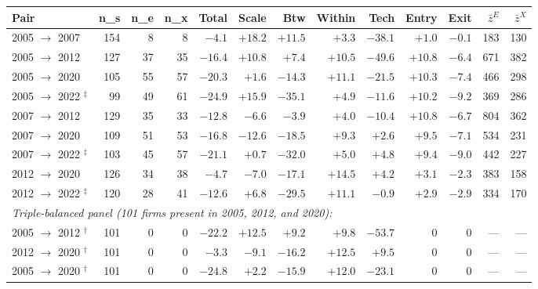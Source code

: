 \documentclass[11pt]{article}
\begin{document}
\begin{center}
\footnotesize
\begin{tabular}{lrrrrrrrrrrrr}
\toprule
Pair & n\_s & n\_e & n\_x & Total & Scale & Btw & Within & Tech & Entry & Exit & $\bar z^E$ & $\bar z^X$ \\
\midrule
2005 $\to$ 2007 & 154 & 8  & 8  & $-4.1$  & $+18.2$ & $+11.5$ & $+3.3$  & $-38.1$ & $+1.0$  & $-0.1$ & 183 & 130 \\
2005 $\to$ 2012 & 127 & 37 & 35 & $-16.4$ & $+10.8$ & $+7.4$  & $+10.5$ & $\mathbf{-49.6}$ & $+10.8$ & $-6.4$ & 671 & 382 \\
2005 $\to$ 2020 & 105 & 55 & 57 & $-20.3$ & $+1.6$  & $-14.3$ & $+11.1$ & $-21.5$          & $+10.3$ & $-7.4$ & 466 & 298 \\
2005 $\to$ 2022 $^{\ddagger}$ & 99  & 49 & 61 & $\mathbf{-24.9}$ & $+15.9$ & $-35.1$ & $+4.9$  & $\mathbf{-11.6}$ & $+10.2$ & $-9.2$ & 369 & 286 \\
2007 $\to$ 2012 & 129 & 35 & 33 & $-12.8$ & $-6.6$  & $-3.9$  & $+4.0$  & $-10.4$          & $+10.8$ & $-6.7$ & 804 & 362 \\
2007 $\to$ 2020 & 109 & 51 & 53 & $-16.8$ & $-12.6$ & $-18.5$ & $+9.3$  & $\mathbf{+2.6}$  & $+9.5$  & $-7.1$ & 534 & 231 \\
2007 $\to$ 2022 $^{\ddagger}$ & 103 & 45 & 57 & $\mathbf{-21.1}$ & $+0.7$  & $-32.0$ & $+5.0$  & $\mathbf{+4.8}$  & $+9.4$  & $-9.0$ & 442 & 227 \\
2012 $\to$ 2020 & 126 & 34 & 38 & $-4.7$  & $-7.0$  & $-17.1$ & $+14.5$ & $\mathbf{+4.2}$  & $+3.1$  & $-2.3$ & 383 & 158 \\
2012 $\to$ 2022 $^{\ddagger}$ & 120 & 28 & 41 & $\mathbf{-12.6}$ & $+6.8$  & $-29.5$ & $+11.1$ & $\mathbf{-0.9}$  & $+2.9$  & $-2.9$ & 334 & 170 \\
\midrule
\multicolumn{13}{l}{\emph{Triple-balanced panel (101 firms present in 2005, 2012, and 2020):}}\\
2005 $\to$ 2012 $^{\dagger}$          & 101 & 0 & 0 & $-22.2$ & $+12.5$ & $+9.2$  & $+9.8$  & $\mathbf{-53.7}$ & 0     & 0       & --- & --- \\
2012 $\to$ 2020 $^{\dagger}$          & 101 & 0 & 0 & $-3.3$  & $-9.1$  & $-16.2$ & $+12.5$ & $\mathbf{+9.5}$  & 0     & 0       & --- & --- \\
2005 $\to$ 2020 $^{\dagger}$          & 101 & 0 & 0 & $-24.8$ & $+2.2$  & $-15.9$ & $+12.0$ & $-23.1$          & 0     & 0       & --- & --- \\

\end{tabular}
\end{center}
\end{document}
